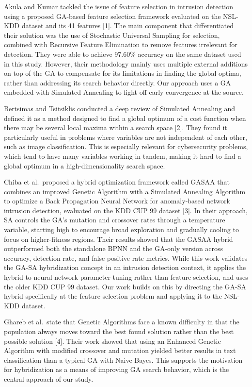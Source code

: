 \documentclass[letterpaper]{article} %
\begin{document}
Akula and Kumar tackled the issue of feature selection in intrusion detection using a proposed GA-based feature selection framework evaluated on the NSL-KDD dataset and its 41 features [1]. The main component that differentiated their solution was the use of Stochastic Universal Sampling for selection, combined with Recursive Feature Elimination to remove features irrelevant for detection. They were able to achieve 97.60\% accuracy on the same dataset used in this study. However, their methodology mainly uses multiple external additions on top of the GA to compensate for its limitations in finding the global optima, rather than addressing its search behavior directly. Our approach uses a GA embedded with Simulated Annealing to fight off early convergence at the source.

Bertsimas and Tsitsiklis conducted a deep review of Simulated Annealing and defined it as a method designed to find a global optimum of a cost function when there may be several local maxima within a search space [2]. They found it particularly useful in problems where variables are not independent of each other, such as image classification. This is especially relevant for cybersecurity problems, which tend to have many variables working in tandem, making it hard to find a global optimum in a high-dimensionality search space.

Chiba et al.\ proposed a hybrid optimization framework called GASAA that combines an improved Genetic Algorithm with a Simulated Annealing Algorithm to optimize a Back Propagation Neural Network for anomaly-based network intrusion detection, evaluated on the KDD CUP 99 dataset [3]. In their approach, SA controls the GA's mutation and crossover rates through a temperature variable, starting high to encourage broad exploration and gradually cooling to focus on higher-fitness regions. Their results showed that the GASAA hybrid outperformed both the standalone BPNN and the GA-only version across accuracy, detection rate, and false positive rate metrics. While this work validates the GA-SA hybridization concept in an intrusion detection context, it applies the hybrid to neural network parameter tuning rather than feature selection, and uses the older KDD CUP 99 dataset. Our work builds on this by directing the GA-SA hybrid specifically at the feature selection problem and applying it to the NSL-KDD dataset.

Ghareb et al.\ state that Genetic Algorithms face a known difficulty in that the population always moves toward the best found solution rather than the best possible solution [4]. Their work showed that using an Enhanced Genetic Algorithm with modified crossover and mutation yielded better results in text classification than a typical GA with Naive Bayes. This supports the motivation for hybridization as a means of improving GA search behavior, which is the central approach of our study.
\end{document}
